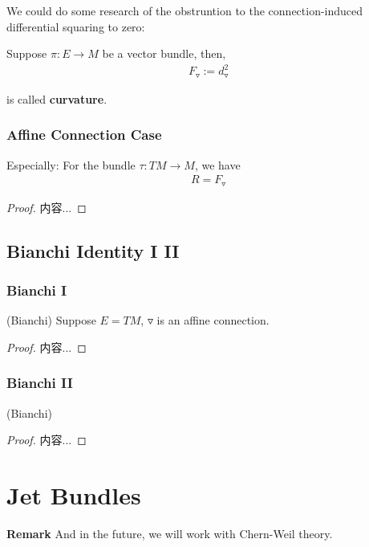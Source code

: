 \documentclass[Total.tex]{subfiles}
\begin{document}
		We could do some research of the obstruntion to the connection-induced differential squaring to zero:
		\begin{Def}
			Suppose $\pi:E\rightarrow M$ be a vector bundle, then, 
			\begin{gather*}
				F_{\triangledown}:=d_\triangledown^2
			\end{gather*}
			
			is called \textbf{curvature}. 
		\end{Def}
		\subsubsection{Affine Connection Case}
		\begin{proposition}
			Especially: For the bundle $\tau:TM\rightarrow M$, we have
			\begin{gather*}
				R=F_\triangledown
			\end{gather*}
		\end{proposition}
		\begin{proof}
			内容...
		\end{proof}
		
		\subsection{Bianchi Identity I II}
			\subsubsection{Bianchi I}
				\begin{theorem}
					(Bianchi) Suppose $E=TM$, $\triangledown$ is an affine connection. 
				\end{theorem}
				\begin{proof}
					内容...
				\end{proof}
			\subsubsection{Bianchi II}
				\begin{theorem}
					(Bianchi)
				\end{theorem}
				\begin{proof}
					内容...
				\end{proof}
				
		\section{Jet Bundles}
		\textbf{Remark} And in the future, we will work with Chern-Weil theory.
\end{document}
